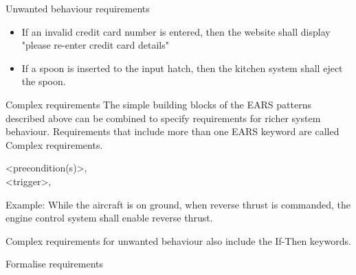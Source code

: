 \documentclass[aspectratio=169]{beamer}
\begin{document}
\begin{frame}[fragile]
\begin{frame}[fragile]
\begin{frame}[fragile]
\begin{slide}{Unwanted behaviour requirements}
  \begin{example}
  \begin{itemize}
    \item If an invalid credit card number is entered, then the website shall display "please re-enter credit card details"
    \item  If a spoon is inserted to the input hatch, then the kitchen system shall eject the spoon.
  \end{itemize}
  \end{example}
\end{slide}



\begin{slide}{Complex requirements}
  The simple building blocks of the EARS patterns described above can be combined to specify requirements for richer system behaviour. Requirements that include more than one EARS keyword are called Complex requirements.
    \begin{block}{}
     \ewhile <precondition(s)>, \\
      \ewhen <trigger>, \\
        
    \end{block}
    Example: While the aircraft is on ground, when reverse thrust is commanded, the engine control system shall enable reverse thrust.

Complex requirements for unwanted behaviour also include the If-Then keywords.
\end{slide}



\begin{slide}{Formalise requirements}




\end{slide}
\end{frame}
\end{frame}
\end{frame}
\end{document}
